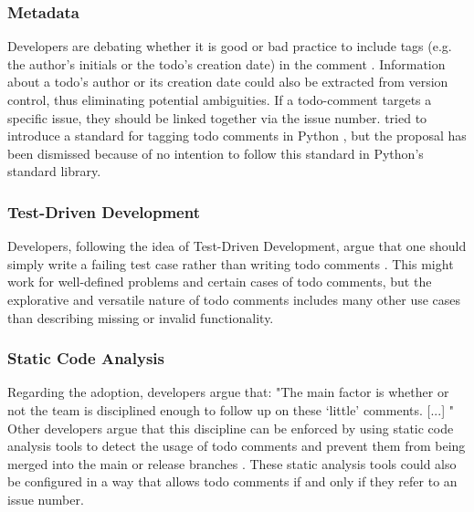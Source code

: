 \subsubsection{Metadata}
Developers are debating whether it is good or bad practice to include tags (e.g. the author's initials or the todo's creation date) in the comment \cite{karacic_todo_2015}.
Information about a todo's author or its creation date could also be extracted from version control, thus eliminating potential ambiguities.
If a todo-comment targets a specific issue, they should be linked together via the issue number.
\citeauthor{elliott_pep_2005} tried to introduce a standard for tagging todo comments in Python \cite{elliott_pep_2005}, but the proposal has been dismissed because of no intention to follow this standard in Python's standard library.

\subsubsection{Test-Driven Development}
Developers, following the idea of Test-Driven Development, argue that one should simply write a failing test case rather than writing todo comments \cite{snoop_does_2016}.
This might work for well-defined problems and certain cases of todo comments, but the explorative and versatile nature of todo comments includes many other use cases than describing missing or invalid functionality.

\subsubsection{Static Code Analysis}
Regarding the adoption, developers argue that: "The main factor is whether or not the team is disciplined enough to follow up on these `little' comments. [...] \cite{karacic_todo_2015}"
Other developers argue that this discipline can be enforced by using static code analysis tools to detect the usage of todo comments and prevent them from being merged into the main or release branches \cite{alecxe_how_2018}.
These static analysis tools could also be configured in a way that allows todo comments if and only if they refer to an issue number.

